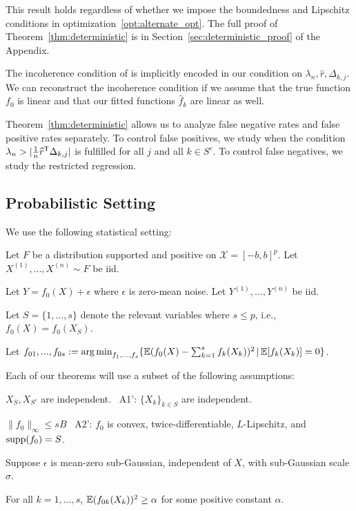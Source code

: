 This result holds regardless of whether we impose the boundedness and Lipschitz conditions in optimization~\ref{opt:alternate_opt}.
The full proof of Theorem~\ref{thm:deterministic} is in Section~\ref{sec:deterministic_proof} of the Appendix.

\begin{remark}
  The incoherence condition of \cite{Wain:09a} is implicitly encoded
  in our condition on $\lambda_n, \hat{r}, \Delta_{k,j}$. We can
  reconstruct the incoherence condition if we assume that the true
  function $f_0$ is linear and that our fitted functions $\hat{f}_k$
  are linear as well.
\end{remark}

Theorem~\ref{thm:deterministic} allows us to analyze false negative
rates and false positive rates separately. To control false positives,
we study when the condition $\lambda_n > | \frac{1}{n} \widehat{r}^{\mathsf{T}}
\Delta_{k,j}|$ is fulfilled for all $j$ and all $k \in S^c$. To
control false negatives, we study the restricted regression.

\subsection{Probabilistic Setting}

We use the following statistical setting:

\begin{packed_enum}
\item Let $F$ be a distribution supported and positive on $\mathcal{X}=[-b,b]^p$. Let $X^{(1)},..., X^{(n)} \sim F$ be iid.
\item Let $Y = f_0(X) + \epsilon$ where $\epsilon$ is zero-mean noise. Let $Y^{(1)},...,Y^{(n)}$ be iid.
\item Let $S = \{1,...,s\}$ denote the relevant variables where $s\leq p$, i.e.,
  $f_0(X) = f_0(X_S)$.
\item Let $f_{01},...,f_{0s} := \mathop{\text{\rm arg\,min}}_{f_1,...,f_s} \{ {\mathbb E}(f_0(X) - \sum_{k=1}^s f_k(X_k))^2 \,|\, {\mathbb E}[f_k(X_k)] = 0 \}$.
\end{packed_enum}

Each of our theorems will use a subset of the following assumptions:
\begin{packed_enum}
\item[A1:] $X_S, X_{S^c}$ are independent.  \ A1': $\{ X_k \}_{k \in S}$ are independent.
\item[A2:] $\|f_0\|_\infty \leq sB$ \  A2': $f_0$ is convex,
  twice-differentiable, $L$-Lipschitz, and $\textrm{supp}(f_0) = S$.
\item[A3:] Suppose $\epsilon$ is mean-zero sub-Gaussian, independent of $X$, with sub-Gaussian scale $\sigma$.
\item[A4:] For all $k=1,...,s$, ${\mathbb E}(f_{0k}(X_k))^2 \geq \alpha$ for some positive constant $\alpha$.
\end{packed_enum}


